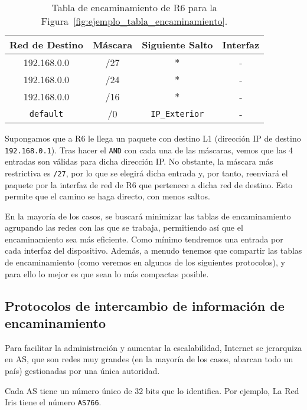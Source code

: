 \begin{ejemplo}
    \begin{table}
        \centering
        \begin{tabular}{|c|c|c|c|}
            \hline
            {Red de Destino} & {Máscara} & {Siguiente Salto} & {Interfaz}\\ \hline
            192.168.0.0 & {\color{red}/27} & $*$ & {\color{red}-}\\
            192.168.0.0 & {\color{olive}/24} & $*$ & {\color{olive}-}\\
            192.168.0.0 & {\color{blue}/16} & $*$ & {\color{blue}-}\\
            \verb|default| & {/0} & \verb|IP_Exterior| & -\\
            \hline
        \end{tabular}
        \caption{Tabla de encaminamiento de R6 para la Figura~\ref{fig:ejemplo_tabla_encaminamiento}.}
        \label{tab:encaminamientoR6}
    \end{table}

    Supongamos que a R6 le llega un paquete con destino L1 (dirección IP de destino \verb|192.168.0.1|). Tras hacer el \verb|AND| con cada una de las máscaras, vemos que las 4 entradas son válidas para dicha dirección IP\@. No obstante, la máscara más restrictiva es \verb|/27|, por lo que se elegirá dicha entrada y, por tanto, reenviará el paquete por la interfaz de red de R6 que pertenece a dicha red de destino. Esto permite que el camino se haga directo, con menos saltos.
\end{ejemplo}

En la mayoría de los casos, se buscará minimizar las tablas de encaminamiento agrupando las redes con las que se trabaja, permitiendo así que el encaminamiento sea más eficiente. Como mínimo tendremos una entrada por cada interfaz del dispositivo. Además, a menudo tenemos que compartir las tablas de encaminamiento (como veremos en algunos de los siguientes protocolos), y para ello lo mejor es que sean lo más compactas posible.

\subsection{Protocolos de intercambio de información de encaminamiento}

Para facilitar la administración y aumentar la escalabilidad, Internet se jerarquiza en \acrfull{AS}, que son redes muy grandes (en la mayoría de los casos, abarcan todo un país) gestionadas por una única autoridad.
\begin{observacion}
Cada \acrshort{AS} tiene un número único de $32$ bits que lo identifica. Por ejemplo, La Red Iris tiene el número \verb|AS766|.
\end{observacion}


